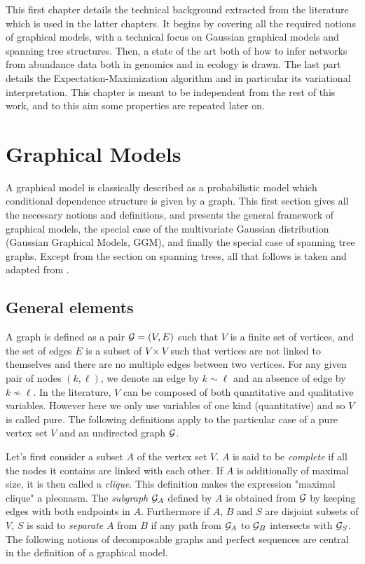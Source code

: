 
This first chapter  details the technical background extracted from the literature which is used in the latter chapters. It begins by covering all the required notions of graphical models, with a technical focus on Gaussian graphical models and spanning tree structures. Then, a state of the art both of how to infer networks from abundance data both in genomics and in ecology is drawn. The last part details the Expectation-Maximization algorithm and in particular its variational interpretation. This chapter is meant to be independent from the rest of this work, and to this aim some properties are repeated later on.
 \section{Graphical Models}
 A graphical model is classically described as a probabilistic model which conditional dependence structure is given by a graph. This first section gives all the necessary notions and definitions, and presents the general framework of graphical models, the special case of the multivariate Gaussian distribution (Gaussian Graphical Models, GGM), and finally the special case of spanning tree graphs. Except from the section on spanning trees, all that follows is taken and adapted from \citet{Lau96}. 
 
 \subsection{General elements}
 A graph is defined as a pair $\mathcal{G}=(V,E)$ such that $V$ is a finite set of vertices, and the set of edges $E$ is a subset of $V\times V$ such that vertices are not linked to themselves and there are no multiple edges between two vertices. For any given pair of nodes $(k,\ell)$, we denote an edge by $k\sim\ell$ and an absence of edge by $k\nsim \ell$. In the literature, $V$ can be composed of both quantitative and qualitative variables. However here we  only use variables of one kind (quantitative) and so $V$ is called pure. The following definitions apply to the particular case of a pure vertex set $V$ and an undirected graph $\mathcal{G}$.

Let's first consider a subset $A$ of the vertex set $V$. $A$ is said to be \textit{complete} if all the nodes it contains are linked with each other. If $A$ is additionally of maximal size, it is then called a \textit{clique}. This definition makes the expression "maximal clique" a pleonasm. The \textit{subgraph} $\mathcal{G}_A$ defined by $A$  is obtained from $\mathcal{G}$ by keeping edges with both endpoints in $A$. Furthermore if $A$, $B$ and $S$ are disjoint subsets of $V$, $S$ is said to \textit{separate} $A$ from $B$ if any path from $\mathcal{G}_A$ to $\mathcal{G}_B$ intersects with $\mathcal{G}_S$. The following notions of decomposable graphs and perfect sequences are central in the definition of a graphical model.
 

